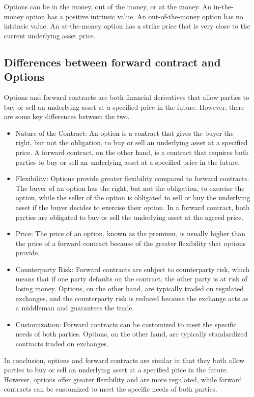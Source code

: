 \documentclass{article}
\theoremstyle{mytheoremstyle}
\theoremstyle{mytheoremstyle}
\theoremstyle{myproblemstyle}
\begin{document}
Options can be in the money, out of the money, or at the money. An in-the-money option has a positive intrinsic value. An out-of-the-money option has no intrinsic value. An at-the-money option has a strike price that is very close to the current underlying asset price.


\newpage
\subsection{Differences between forward contract and Options}

Options and forward contracts are both financial derivatives that allow parties to buy or sell an underlying asset at a specified price in the future. However, there are some key differences between the two.


\begin{itemize}
	\item Nature of the Contract: An option is a contract that gives the buyer the right, but not the obligation, to buy or sell an underlying asset at a specified price. A forward contract, on the other hand, is a contract that requires both parties to buy or sell an underlying asset at a specified price in the future.
	\item Flexibility: Options provide greater flexibility compared to forward contracts. The buyer of an option has the right, but not the obligation, to exercise the option, while the seller of the option is obligated to sell or buy the underlying asset if the buyer decides to exercise their option. In a forward contract, both parties are obligated to buy or sell the underlying asset at the agreed price.
	\item Price: The price of an option, known as the premium, is usually higher than the price of a forward contract because of the greater flexibility that options provide.
	\item Counterparty Risk: Forward contracts are subject to counterparty risk, which means that if one party defaults on the contract, the other party is at risk of losing money. Options, on the other hand, are typically traded on regulated exchanges, and the counterparty risk is reduced because the exchange acts as a middleman and guarantees the trade.
	\item Customization: Forward contracts can be customized to meet the specific needs of both parties. Options, on the other hand, are typically standardized contracts traded on exchanges.
\end{itemize}
In conclusion, options and forward contracts are similar in that they both allow parties to buy or sell an underlying asset at a specified price in the future. However, options offer greater flexibility and are more regulated, while forward contracts can be customized to meet the specific needs of both parties.
\end{document}
